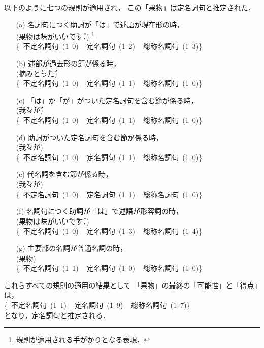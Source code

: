 以下のように七つの規則が適用され，
この「果物」は定名詞句と推定された．

\begin{itemize}
\item[(a)] 名詞句につく助詞が「は」で述語が現在形の時，\\(果物\.は味が\.い\.い\.で\.す．)
\footnote{規則が適用される手がかりとなる表現．}
\\
\mbox{\{
\mbox{不定名詞句}  (1 0) \,
\mbox{定名詞句}  (1 2)   \,
\mbox{総称名詞句}  (1 3)\}}

\item[(b)] 述部が過去形の節が係る時，\\(摘み\.と\.っ\.た)\\
\mbox{\{
\mbox{不定名詞句}  (1  0) \,
\mbox{定名詞句}    (1  1) \, 
\mbox{総称名詞句}  (1  0)\}}

\item[(c)] 「は」か「が」がついた定名詞句を含む節が係る時，\\(\.我\.々\.が)\\
\mbox{\{
\mbox{不定名詞句}  (1  0) \,
\mbox{定名詞句}  (1  1) \,
\mbox{総称名詞句}  (1  0)\}}

\item[(d)] 助詞がついた定名詞句を含む節が係る時，\\(\.我\.々が)\\
\mbox{\{
\mbox{不定名詞句}  (1  0) \,
\mbox{定名詞句}  (1  1) \,
\mbox{総称名詞句}  (1  0)\}}

\item[(e)] 代名詞を含む節が係る時，\\(\.我\.々が)\\
\mbox{\{
\mbox{不定名詞句}  (1  0) \,
\mbox{定名詞句}    (1  1) \,
\mbox{総称名詞句}  (1  0)\}}

\item[(f)] 名詞句につく助詞が「は」で述語が形容詞の時，\\(果物\.は味が\.い\.い\.で\.す．)\\
\mbox{\{
\mbox{不定名詞句}  (1  0) \,
\mbox{定名詞句}    (1  3) \,
\mbox{総称名詞句}  (1  4)\}}

\item[(g)] 主要部の名詞が普通名詞の時，\\(果物)\\
\mbox{\{
\mbox{不定名詞句}  (1  1) \,
\mbox{定名詞句}    (1  0) \,
\mbox{総称名詞句}  (1  0)\}}

\end{itemize}

これらすべての規則の適用の結果として
「果物」の最終の「可能性」と「得点」は，\\
\mbox{\{
\mbox{不定名詞句}  (1  1) \,
\mbox{定名詞句}    (1  9) \,
\mbox{総称名詞句}  (1  7)\}}\\
となり，定名詞句と推定される．

